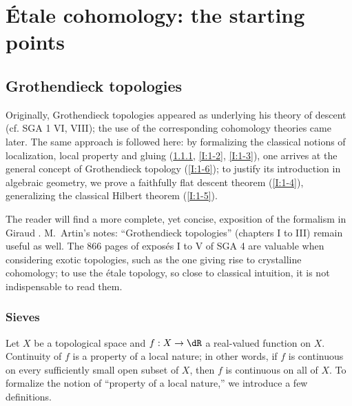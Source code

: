 
\chapter{\'Etale cohomology: the starting points}\label{I}




















\section{Grothendieck topologies}\label{I:1}

Originally, Grothendieck topologies appeared as underlying
his theory of descent (cf. SGA 1 VI, VIII); the use of the corresponding
cohomology theories came later. The same approach is followed
here: by formalizing the classical notions of localization, local
property and gluing (\ref{I:1-1}, \ref{I:1-2}, \ref{I:1-3}), one arrives at
the general concept of Grothendieck topology (\ref{I:1-6}); to justify
its introduction in algebraic geometry, we prove a faithfully
flat descent theorem (\ref{I:1-4}), generalizing the classical Hilbert
theorem (\ref{I:1-5}).

The reader will find a more complete, yet concise, exposition of the
formalism in Giraud \cite{gi64}. M.\ Artin's notes: ``Grothendieck
topologies'' \cite{ar62} (chapters I to III) remain useful as well. The
866 pages of expos\'es I to V of SGA 4 are valuable when
considering exotic topologies, such as the one giving rise to
crystalline cohomology; to use the \'etale topology, so close to
classical intuition, it is not indispensable to read them. 










\subsection{Sieves}\label{I:1-1}

Let $X$ be a topological space and $f:X\to \dR$ a real-valued
function on $X$. Continuity of $f$ is a property of a
local nature; in other words, if $f$ is continuous on every sufficiently small
open subset of $X$, then $f$ is continuous on all of $X$. To formalize the notion of
``property of a local nature,'' we introduce a few definitions.

